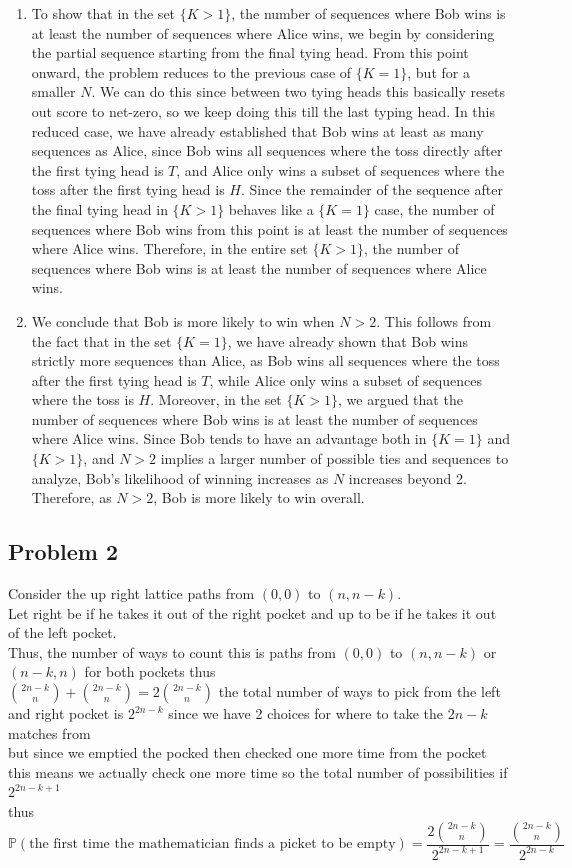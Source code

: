 \documentclass[12pt, letterpaper]{article}
\theoremstyle{definition}
\renewcommand{\P}{\mathbb{P}}
\renewcommand{\t}[1]{\text{#1}}
\begin{document}
\begin{enumerate}
    \item To show that in the set $\{K > 1\}$, the number of sequences where Bob wins is at least the number of sequences where Alice wins, we begin by considering the partial sequence starting from the final tying head. 
    From this point onward, the problem reduces to the previous case of $\{K = 1\}$, but for a smaller $N$. We can do this since between two tying heads this basically resets out score to net-zero, so we keep doing this till the last typing head.
    In this reduced case, we have already established that Bob wins at least as many sequences as Alice, since Bob wins all sequences where the toss directly after the first tying head is $T$, and Alice only wins a subset of sequences where the toss after the first tying head is $H$. 
    Since the remainder of the sequence after the final tying head in $\{K > 1\}$ behaves like a $\{K = 1\}$ case, the number of sequences where Bob wins from this point is at least the number of sequences where Alice wins. 
    Therefore, in the entire set $\{K > 1\}$, the number of sequences where Bob wins is at least the number of sequences where Alice wins.
    \item We conclude that Bob is more likely to win when $N > 2$. 
    This follows from the fact that in the set $\{K = 1\}$, we have already shown that Bob wins strictly more sequences than Alice, as Bob wins all sequences where the toss after the first tying head is $T$, while Alice only wins a subset of sequences where the toss is $H$. 
    Moreover, in the set $\{K > 1\}$, we argued that the number of sequences where Bob wins is at least the number of sequences where Alice wins. 
    Since Bob tends to have an advantage both in $\{K = 1\}$ and $\{K > 1\}$, and $N > 2$ implies a larger number of possible ties and sequences to analyze, Bob’s likelihood of winning increases as $N$ increases beyond 2. 
    Therefore, as $N > 2$, Bob is more likely to win overall.

\end{enumerate}

\newpage
\subsection*{Problem 2}
Consider the up right lattice paths from $(0,0)$ to $(n,n-k)$.\\
Let right be if he takes it out of the right pocket and up to be if he takes it out of the left pocket.\\
Thus, the number of ways to count this is paths from $(0,0)$ to $(n,n-k)$ or $(n-k,n)$ for both pockets thus\\
$\binom{2n-k}{n}+\binom{2n-k}{n}=2\binom{2n-k}{n}$ the total number of ways to pick from the left and right pocket is $2^{2n-k}$ since we have 2 choices for where to take the $2n-k$ matches from\\
but since we emptied the pocked then checked one more time from the pocket this means we actually check one more time so the total number of possibilities if $2^{2n-k+1}$\\
thus $\P(\t{the first time the mathematician finds a picket to be empty})=\dfrac{2\binom{2n-k}{n}}{2^{2n-k+1}}=\dfrac{\binom{2n-k}{n}}{2^{2n-k}}$
\end{document}
